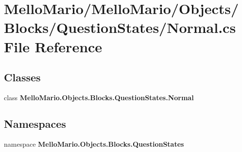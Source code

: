 \section{Mello\+Mario/\+Mello\+Mario/\+Objects/\+Blocks/\+Question\+States/\+Normal.cs File Reference}
\label{Blocks_2QuestionStates_2Normal_8cs}
\subsection*{Classes}
\begin{DoxyCompactItemize}
\item 
class \textbf{ Mello\+Mario.\+Objects.\+Blocks.\+Question\+States.\+Normal}
\end{DoxyCompactItemize}
\subsection*{Namespaces}
\begin{DoxyCompactItemize}
\item 
namespace \textbf{ Mello\+Mario.\+Objects.\+Blocks.\+Question\+States}
\end{DoxyCompactItemize}
